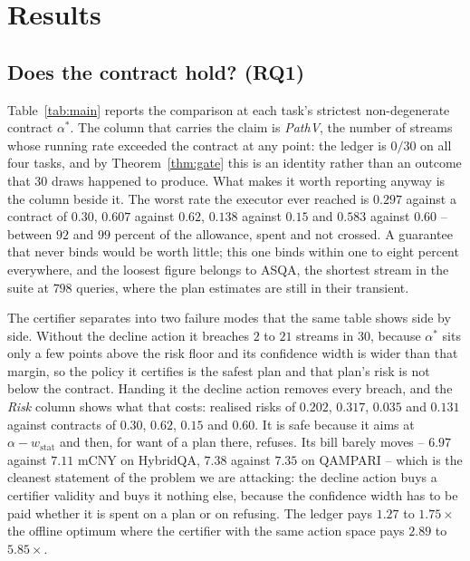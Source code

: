 \section{Results}
\label{sec:results}



\subsection{Does the contract hold? (RQ1)}
\label{sec:res:valid}

Table~\ref{tab:main} reports the comparison at each task's strictest
non-degenerate contract $\alpha^{*}$. The column that carries the claim
is \emph{PathV}, the number of streams whose running rate exceeded the
contract at any point: the ledger is $0/30$ on all four tasks, and by
Theorem~\ref{thm:gate} this is an identity rather than an outcome that
$30$ draws happened to produce. What makes it worth reporting anyway is
the column beside it. The worst rate the executor ever reached is
$0.297$ against a contract of $0.30$, $0.607$ against $0.62$, $0.138$
against $0.15$ and $0.583$ against $0.60$ -- between $92$ and $99$
percent of the allowance, spent and not crossed. A guarantee that never
binds would be worth little; this one binds within one to eight percent
everywhere, and the loosest figure belongs to ASQA, the shortest stream
in the suite at $798$ queries, where the plan estimates are still in
their transient.

The certifier separates into two failure modes that the same table shows
side by side. Without the decline action it breaches $2$ to $21$ streams
in $30$, because $\alpha^{*}$ sits only a few points above the risk
floor and its confidence width is wider than that margin, so the policy
it certifies is the safest plan and that plan's risk is not below the
contract. Handing it the decline action removes every breach, and the
\emph{Risk} column shows what that costs: realised risks of $0.202$,
$0.317$, $0.035$ and $0.131$ against contracts of $0.30$, $0.62$, $0.15$
and $0.60$. It is safe because it aims at $\alpha - w_{\mathrm{stat}}$
and then, for want of a plan there, refuses. Its bill barely moves --
$6.97$ against $7.11$ mCNY on HybridQA, $7.38$ against $7.35$ on
QAMPARI -- which is the cleanest statement of the problem we are
attacking: the decline action buys a certifier validity and buys it
nothing else, because the confidence width has to be paid whether it is
spent on a plan or on refusing. The ledger pays $1.27$ to
$1.75\times$ the offline optimum where the certifier with the same
action space pays $2.89$ to $5.85\times$.

